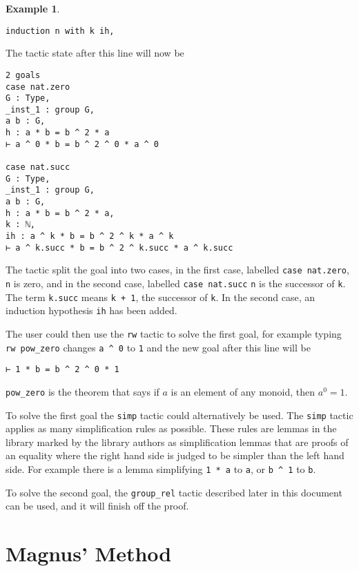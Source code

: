 \documentclass[12pt]{article} %
\theoremstyle{definition}
\theoremstyle{definition}
\theoremstyle{definition}
\theoremstyle{definition}
\newtheorem{exmpl}[thm]{Example}
\begin{document}
\begin{exmpl}
\begin{lstlisting}
induction n with k ih,
\end{lstlisting}

The tactic state after this line will now be

\begin{lstlisting}
2 goals
case nat.zero
G : Type,
_inst_1 : group G,
a b : G,
h : a * b = b ^ 2 * a
⊢ a ^ 0 * b = b ^ 2 ^ 0 * a ^ 0

case nat.succ
G : Type,
_inst_1 : group G,
a b : G,
h : a * b = b ^ 2 * a,
k : ℕ,
ih : a ^ k * b = b ^ 2 ^ k * a ^ k
⊢ a ^ k.succ * b = b ^ 2 ^ k.succ * a ^ k.succ
\end{lstlisting}

The tactic split the goal into two cases, in the first case, labelled \lstinline{case nat.zero},
\lstinline{n} is zero, and in the second case, labelled \lstinline{case nat.succ}
\lstinline{n} is the successor of \lstinline{k}. The term \lstinline{k.succ} means \lstinline{k + 1},
the successor of \lstinline{k}. In the second case, an induction
hypothesis \lstinline{ih} has been added.

The user could then use the \lstinline{rw} tactic to solve the first goal,
for example typing \lstinline{rw pow_zero} changes \lstinline{a ^ 0}
to \lstinline{1} and the new goal after this line will be
\begin{lstlisting}
⊢ 1 * b = b ^ 2 ^ 0 * 1
\end{lstlisting}

\lstinline{pow_zero} is the theorem that says if $a$ is an
element of any monoid, then $a^0= 1$.

To solve the first goal the \lstinline{simp} tactic could alternatively be used.
The \lstinline{simp} tactic applies as many simplification rules as possible.
These rules are lemmas in the library marked by the library authors as simplification
lemmas that are proofs of an equality where the right hand side is judged to be simpler
than the left hand side. For example there is a lemma simplifying \lstinline{1 * a} to
\lstinline{a}, or \lstinline{b ^ 1} to \lstinline{b}.

To solve the second goal, the \lstinline{group_rel} tactic described
later in this document can be used, and it will finish off the proof.

\end{exmpl}

\section{Magnus' Method}\label{magnusmethod}
\end{document}
